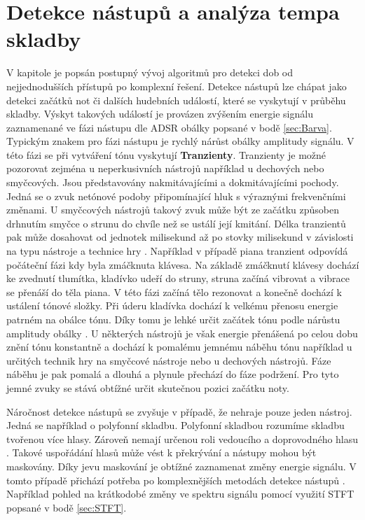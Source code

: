
\section{Detekce nástupů a analýza tempa skladby} \label{sec:Detekce_tempa}
V kapitole je popsán postupný vývoj algoritmů pro detekci dob od nejjednodušších přístupů po komplexní řešení. Detekce nástupů lze chápat jako detekci začátků not či dalších hudebních událostí, které se vyskytují v průběhu skladby. Výskyt takových událostí je provázen zvýšením energie signálu zaznamenané ve fázi nástupu dle \acs{ADSR} obálky popsané v bodě \ref{sec:Barva}. Typickým znakem pro fázi nástupu je rychlý nárůst obálky amplitudy signálu.
V této fázi se při vytváření tónu vyskytují \textbf{Tranzienty}. Tranzienty je možné pozorovat zejména u neperkusivních nástrojů například u dechových nebo smyčcových. Jsou představovány nakmitávajícími a dokmitávajícími pochody. Jedná se o zvuk netónové podoby připomínající hluk s výraznými frekvenčními změnami. U smyčcových nástrojů takový zvuk může být ze začátku způsoben drhnutím smyčce o strunu do chvíle než se ustálí její kmitání. Délka tranzientů pak může dosahovat od jednotek milisekund až po stovky milisekund v závislosti na typu nástroje a technice hry \cite{syrový2013hudební}. Například v případě piana tranzient odpovídá počáteční fázi kdy byla zmáčknuta klávesa. Na základě zmáčknutí klávesy dochází ke zvednutí tlumítka, kladívko udeří do struny, struna začíná vibrovat a vibrace se přenáší do těla piana. V této fázi začíná tělo rezonovat a konečně dochází k ustálení tónové složky. Při úderu kladívka dochází k velkému přenosu energie patrném na obálce tónu. Díky tomu je lehké určit začátek tónu podle nárůstu amplitudy obálky \cite{fundamental_of_music_processing}. U některých nástrojů je však energie přenášená po celou dobu znění tónu konstantně a dochází k pomalému jemnému náběhu tónu například u určitých technik hry na smyčcové nástroje nebo u dechových nástrojů. Fáze náběhu je pak pomalá a dlouhá a plynule přechází do fáze podržení. Pro tyto jemné zvuky se stává obtížné určit skutečnou pozici začátku noty.

Náročnost detekce nástupů se zvyšuje v případě, že nehraje pouze jeden nástroj. Jedná se například o polyfonní skladbu. Polyfonní skladbou rozumíme skladbu tvořenou více hlasy.
Zároveň nemají určenou roli vedoucího a doprovodného hlasu \cite{6155601}.
Takové uspořádání hlasů může vést k překrývání a nástupy mohou být maskovány. Díky jevu maskování je obtížné zaznamenat změny energie signálu. V tomto případě přichází potřeba po komplexnějších metodách detekce nástupů \cite{fundamental_of_music_processing}. Například pohled na krátkodobé změny ve spektru signálu pomocí využití \acs{STFT} popsané v bodě \ref{sec:STFT}.

